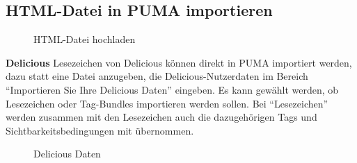 \subsection{HTML-Datei in PUMA importieren}
\label{subsec:htmlDateiImportieren}
\begin{figure}[h!]
 \centering
 \caption{HTML-Datei hochladen}
 \label{fig:htmlDateiHochladen}
\end{figure}

\textbf{Delicious}
\label{subsec:delicious}
Lesezeichen von Delicious können direkt in PUMA importiert werden, dazu statt eine Datei anzugeben, die Delicious-Nutzerdaten im Bereich \enquote{Importieren Sie Ihre Delicious Daten} eingeben. \newline
Es kann gewählt werden, ob Lesezeichen oder Tag-Bundles importieren werden sollen. Bei \enquote{Lesezeichen} werden zusammen mit den Lesezeichen auch die dazugehörigen Tags und Sichtbarkeitsbedingungen mit übernommen.
\begin{figure}[h!]
 \centering
 \caption{Delicious Daten}
 \label{fig:deliciousDaten}
\end{figure} 

